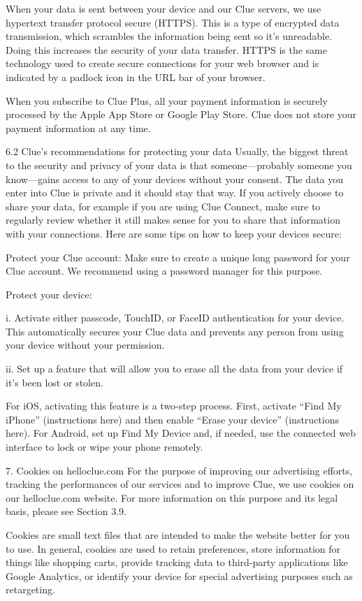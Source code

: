 When your data is sent between your device and our Clue servers, we use hypertext transfer protocol secure (HTTPS). This is a type of encrypted data transmission, which scrambles the information being sent so it’s unreadable. Doing this increases the security of your data transfer. HTTPS is the same technology used to create secure connections for your web browser and is indicated by a padlock icon in the URL bar of your browser.

When you subscribe to Clue Plus, all your payment information is securely processed by the Apple App Store or Google Play Store. Clue does not store your payment information at any time.

6.2 Clue’s recommendations for protecting your data
Usually, the biggest threat to the security and privacy of your data is that someone—probably someone you know—gains access to any of your devices without your consent. The data you enter into Clue is private and it should stay that way. If you actively choose to share your data, for example if you are using Clue Connect, make sure to regularly review whether it still makes sense for you to share that information with your connections. Here are some tips on how to keep your devices secure:

Protect your Clue account: Make sure to create a unique long password for your Clue account. We recommend using a password manager for this purpose.

Protect your device:

i. Activate either passcode, TouchID, or FaceID authentication for your device. This automatically secures your Clue data and prevents any person from using your device without your permission.

ii. Set up a feature that will allow you to erase all the data from your device if it’s been lost or stolen.

For iOS, activating this feature is a two-step process. First, activate “Find My iPhone” (instructions here) and then enable “Erase your device” (instructions here). For Android, set up Find My Device and, if needed, use the connected web interface to lock or wipe your phone remotely.

7. Cookies on helloclue.com
For the purpose of improving our advertising efforts, tracking the performances of our services and to improve Clue, we use cookies on our helloclue.com website. For more information on this purpose and its legal basis, please see Section 3.9.

Cookies are small text files that are intended to make the website better for you to use. In general, cookies are used to retain preferences, store information for things like shopping carts, provide tracking data to third-party applications like Google Analytics, or identify your device for special advertising purposes such as retargeting.

